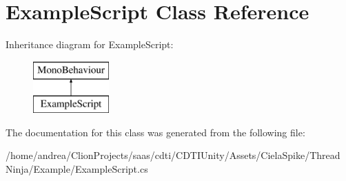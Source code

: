 \hypertarget{class_example_script}{}\section{Example\+Script Class Reference}
\label{class_example_script}
Inheritance diagram for Example\+Script\+:\begin{figure}[H]
\begin{center}
\leavevmode
\includegraphics[height=2.000000cm]{class_example_script}
\end{center}
\end{figure}


The documentation for this class was generated from the following file\+:\begin{DoxyCompactItemize}
\item 
/home/andrea/\+Clion\+Projects/saas/cdti/\+C\+D\+T\+I\+Unity/\+Assets/\+Ciela\+Spike/\+Thread Ninja/\+Example/Example\+Script.\+cs\end{DoxyCompactItemize}
